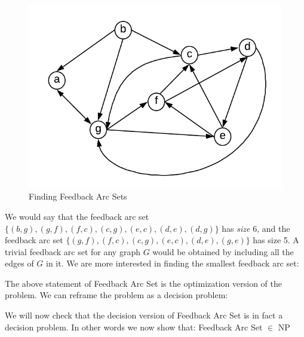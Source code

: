 \documentclass{article}
\begin{document}
\begin{figure}[H]
    \centering
    \includegraphics[scale=0.8]{figures/feedback-arc-set.png}
    \caption{Finding Feedback Arc Sets}
    \label{fig:my_label}
\end{figure}

We would say that the feedback arc set $\{(b,g), (g,f), ( f,c), (c,g), (e,c), (d,e), (d,g)\}$ has {\em size} 6, and the feedback arc set $\{(g,f), (f,c), (c,g), (e,c), (d,e), (g,e)\}$ has size 5. A trivial feedback arc set for any graph $G$ would be obtained by including all the edges of $G$ in it. We are more interested in finding the smallest feedback arc set:

\vspace{.5cm}
\noindent{}
\vspace{.5cm}

The above statement of Feedback Arc Set is the optimization version of the problem. We can reframe the problem as a decision problem:

\vspace{.5cm}
\noindent{}
\vspace{.5cm}

We will now check that the decision version of Feedback Arc Set is in fact a decision problem. In other words we now show that: Feedback Arc Set $\in$ NP
\end{document}
